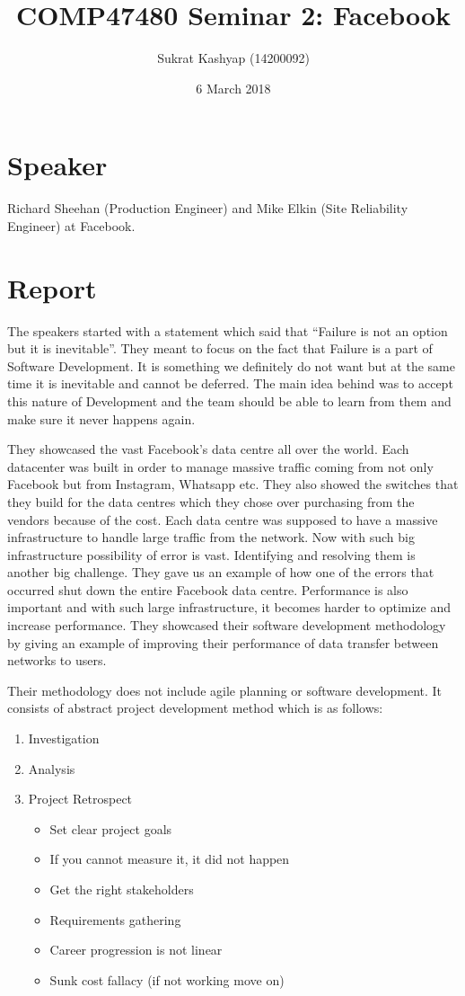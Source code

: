 \documentclass[10pt]{article}
\title{\vspace{-3.0cm}COMP47480 Seminar 2: Facebook}
\author{Sukrat Kashyap (14200092)}
\date{6 March 2018}
\begin{document}
\maketitle

\section{Speaker}

Richard Sheehan (Production Engineer) and Mike Elkin (Site Reliability Engineer) at Facebook.

\section{Report}

The speakers started with a statement which said that ``Failure is not an option but it is inevitable''. They meant to focus on the fact that Failure is a part of Software Development. It is something we definitely do not want but at the same time it is inevitable and cannot be deferred. The main idea behind was to accept this nature of Development and the team should be able to learn from them and make sure it never happens again. 

They showcased the vast Facebook's data centre all over the world. Each datacenter was built in order to manage massive traffic coming from not only Facebook but from Instagram, Whatsapp etc. They also showed the switches that they build for the data centres which they chose over purchasing from the vendors because of the cost. Each data centre was supposed to have a massive infrastructure to handle large traffic from the network. Now with such big infrastructure possibility of error is vast. Identifying and resolving them is another big challenge. They gave us an example of how one of the errors that occurred shut down the entire Facebook data centre. Performance is also important and with such large infrastructure, it becomes harder to optimize and increase performance. They showcased their software development methodology by giving an example of improving their performance of data transfer between networks to users.

Their methodology does not include agile planning or software development. It consists of abstract project development method which is as follows:
\begin{enumerate}
      \item Investigation
      \item Analysis
      \item Project Retrospect
      \begin{itemize}
            \item Set clear project goals
            \item If you cannot measure it, it did not happen
            \item Get the right stakeholders
            \item Requirements gathering
            \item Career progression is not linear
            \item Sunk cost fallacy (if not working move on)
      \end{itemize}
\end{enumerate}
\end{document}
